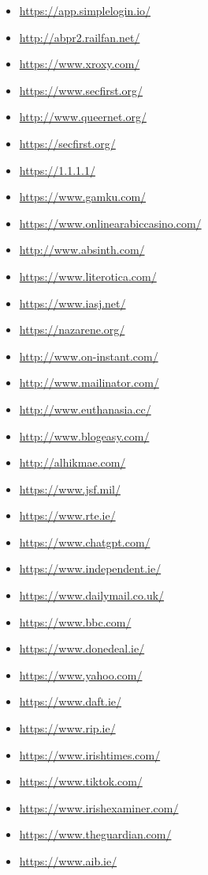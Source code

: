 \begin{multicols}{2}
\begin{itemize}
    \item \url{https://app.simplelogin.io/}
    \item \url{http://abpr2.railfan.net/}
    \item \url{https://www.xroxy.com/}
    \item \url{https://www.secfirst.org/}
    \item \url{http://www.queernet.org/}
    \item \url{https://secfirst.org/}
    \item \url{https://1.1.1.1/}
    \item \url{https://www.gamku.com/}
    \item \url{https://www.onlinearabiccasino.com/}
    \item \url{http://www.absinth.com/}
    \item \url{https://www.literotica.com/}
    \item \url{https://www.iasj.net/}
    \item \url{https://nazarene.org/}
    \item \url{http://www.on-instant.com/}
    \item \url{http://www.mailinator.com/}
    \item \url{http://www.euthanasia.cc/}
    \item \url{http://www.blogeasy.com/}
    \item \url{http://alhikmae.com/}
    \item \url{https://www.jsf.mil/}
    \item \url{https://www.rte.ie/}
    \item \url{https://www.chatgpt.com/}
    \item \url{https://www.independent.ie/}
    \item \url{https://www.dailymail.co.uk/}
    \item \url{https://www.bbc.com/}
    \item \url{https://www.donedeal.ie/}
    \item \url{https://www.yahoo.com/}
    \item \url{https://www.daft.ie/}
    \item \url{https://www.rip.ie/}
    \item \url{https://www.irishtimes.com/}
    \item \url{https://www.tiktok.com/}
    \item \url{https://www.irishexaminer.com/}
    \item \url{https://www.theguardian.com/}
    \item \url{https://www.aib.ie/}

\end{itemize}
\end{multicols}
